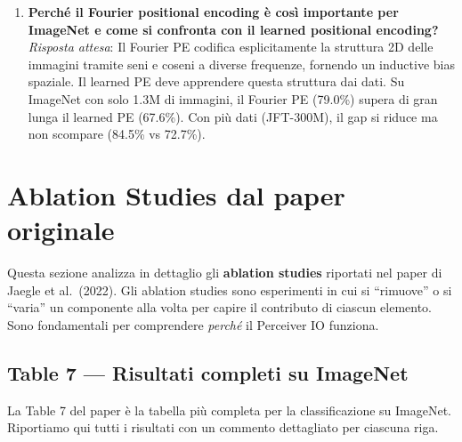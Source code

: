 \documentclass[12pt,a4paper]{article}
\begin{document}
\begin{enumerate}[label=\textbf{Q\arabic*.}, resume]
    \item \textbf{Perch\'e il Fourier positional encoding \`e cos\`i importante per ImageNet e come si confronta con il learned positional encoding?}\\
    \textit{Risposta attesa}: Il Fourier PE codifica esplicitamente la struttura 2D delle immagini tramite seni e coseni a diverse frequenze, fornendo un inductive bias spaziale. Il learned PE deve apprendere questa struttura dai dati. Su ImageNet con solo 1.3M di immagini, il Fourier PE (79.0\%) supera di gran lunga il learned PE (67.6\%). Con pi\`u dati (JFT-300M), il gap si riduce ma non scompare (84.5\% vs 72.7\%).
\end{enumerate}


\section{Ablation Studies dal paper originale}

Questa sezione analizza in dettaglio gli \textbf{ablation studies} riportati nel paper di Jaegle et al.\ (2022). Gli ablation studies sono esperimenti in cui si ``rimuove'' o si ``varia'' un componente alla volta per capire il contributo di ciascun elemento. Sono fondamentali per comprendere \emph{perch\'e} il Perceiver IO funziona.

\subsection{Table 7 --- Risultati completi su ImageNet}

La Table 7 del paper \`e la tabella pi\`u completa per la classificazione su ImageNet. Riportiamo qui tutti i risultati con un commento dettagliato per ciascuna riga.
\end{document}
